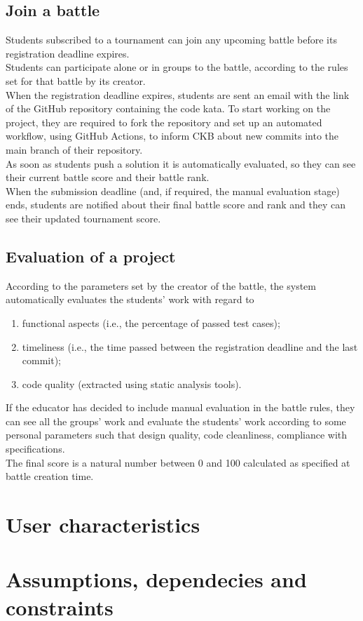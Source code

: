 \subsection{Join a battle}
Students subscribed to a tournament can join any upcoming battle before its registration deadline expires.\\
Students can participate alone or in groups to the battle, according to the rules set for that battle by its creator.\\
When the registration deadline expires, students are sent an email with the link of the GitHub repository containing the 
code kata. To start working on the project, they are required to fork the repository and set up an automated workflow, 
using GitHub Actions, to inform CKB about new commits into the main branch of their repository.\\
As soon as students push a solution it is automatically evaluated, so they can see their current battle score and their 
battle rank.\\
When the submission deadline (and, if required, the manual evaluation stage) ends, students are notified about their final 
battle score and rank and they can see their updated tournament score.\\

\subsection{Evaluation of a project}
According to the parameters set by the creator of the battle, the system automatically evaluates the students' work with regard to
\begin{enumerate}
  \item functional aspects (i.e., the percentage of passed test cases);
  \item timeliness (i.e., the time passed between the registration deadline and the last commit);
  \item code quality (extracted using static analysis tools).
\end{enumerate}
If the educator has decided to include manual evaluation in the battle rules, they can see all the groups' work and evaluate 
the students' work according to some personal parameters such that design quality, code cleanliness, compliance with specifications.\\
The final score is a natural number between 0 and 100 calculated as specified at battle creation time.\\


\section{User characteristics}

\section{Assumptions, dependecies and constraints}


